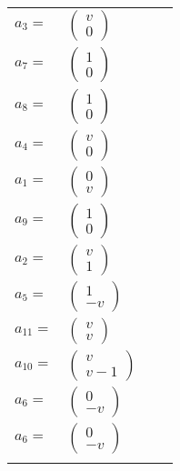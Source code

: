 \documentclass[1p]{elsarticle_modified}
\theoremstyle{definition}
\begin{document}
\begin{tabular}{m{7pt} m{180pt} m{7pt} m{180pt} }
\flushright $a_{3}=$&$\begin{pmatrix}v\\0\end{pmatrix}$ \\
\flushright $a_{7}=$&$\begin{pmatrix}1\\0\end{pmatrix}$ \\
\flushright $a_{8}=$&$\begin{pmatrix}1\\0\end{pmatrix}$ \\
\flushright $a_{4}=$&$\begin{pmatrix}v\\0\end{pmatrix}$ \\
\flushright $a_{1}=$&$\begin{pmatrix}0\\v\end{pmatrix}$ \\
\flushright $a_{9}=$&$\begin{pmatrix}1\\0\end{pmatrix}$ \\
\flushright $a_{2}=$&$\begin{pmatrix}v\\1\end{pmatrix}$ \\
\flushright $a_{5}=$&$\begin{pmatrix}1\\- v\end{pmatrix}$ \\
\flushright $a_{11}=$&$\begin{pmatrix}v\\v\end{pmatrix}$ \\
\flushright $a_{10}=$&$\begin{pmatrix}v\\v-1\end{pmatrix}$ \\
\flushright $a_{6}=$&$\begin{pmatrix}0\\- v\end{pmatrix}$\\ \flushright $a_{6}=$&$\begin{pmatrix}0\\- v\end{pmatrix}$\\&\end{tabular}
\end{document}
